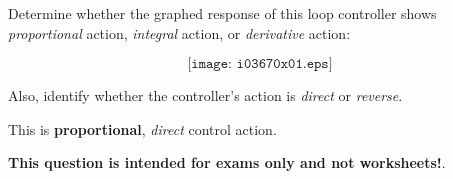 

Determine whether the graphed response of this loop controller shows {\it proportional} action, {\it integral} action, or {\it derivative} action:

$$\texttt{[image: i03670x01.eps]}$$

Also, identify whether the controller's action is {\it direct} or {\it reverse}.







This is {\bf proportional}, {\it direct} control action.







{\bf This question is intended for exams only and not worksheets!}.


